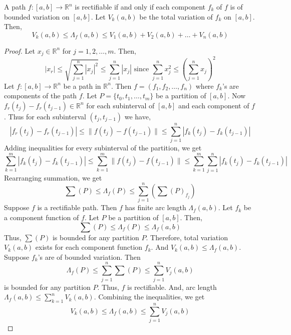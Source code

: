 \begin{theorem}
	A path $f : [a,b] \to \mathbb{R}^n$ is rectifiable if and only if each component $f_k$ of $f$ is of bounded variation on $[a,b]$.
	Let $V_k(a,b)$ be the total variation of $f_k$ on $[a,b]$.
	Then,
	\[ V_k(a,b) \le \Lambda_f(a,b) \le V_1(a,b) + V_2(a,b) + \dots + V_n(a,b) \]
\end{theorem}
\begin{proof}
	Let $x_j \in \mathbb{R}^n$ for $j = 1,2,\dots,m$.
	Then,
	\[ |x_r| \le \sqrt{\sum_{j=1}^n |x_j|^2} \le \sum_{j=1}^n |x_j| \text{ since } \sum_{j=1}^n x_j^2 \le \left(\sum_{j=1}^n x_j\right)^2 \]
	Let $f : [a,b] \to \mathbb{R}^n$ be a path in $\mathbb{R}^n$.
	Then $f = (f_1,f_2,\dots,f_n)$ where $f_k$'s are components of the path $f$.
	Let $P = \{ t_0,t_1,\dots,t_m \}$ be a partition of $[a,b]$.
	Now $f_r(t_j)-f_r(t_{j-1}) \in \mathbb{R}^n$ for each subinterval of $[a,b]$ and each component of $f$.
	Thus for each subinterval $(t_j,t_{j-1})$ we have,
	\[ |f_r(t_j)-f_r(t_{j-1})| \le \| f(t_j)-f(t_{j-1}) \| \le \sum_{j=1}^n |f_k(t_j)-f_k(t_{j-1})| \] 
	Adding inequalities for every subinterval of the partition, we get
	\[ \sum_{k=1}^m |f_k(t_j)-f_k(t_{j-1})| \le \sum_{k=1}^m \| f(t_j)-f(t_{j-1}) \| \le \sum_{k=1}^m \sum_{j=1}^n |f_k(t_j)-f_k(t_{j-1})| \] 
	Rearranging summation, we get
	\[ \sum (P) \le \Lambda_f (P) \le \sum_{j=1}^n \left( \sum (P)_{f_j} \right) \] 
	Suppose $f$ is a rectifiable path.
	Then $f$ has finite arc length $\Lambda_f (a,b)$.
	Let $f_k$ be a component function of $f$.
	Let $P$ be a partition of $[a,b]$.
	Then,
	\[ \sum (P) \le \Lambda_f(P) \le \Lambda_f (a,b) \]
	Thus, $\sum (P)$ is bounded for any partition $P$.
	Therefore, total variation $V_k(a,b)$ exists for each component function $f_k$.
	And $V_k(a,b) \le \Lambda_f(a,b)$.\\

	Suppose $f_k$'s are of bounded variation.
	Then \[ \Lambda_f(P) \le \sum_{j=1}^n \sum (P) \le \sum_{j=1}^n V_j(a,b) \] is bounded for any partition $P$.
	Thus, $f$ is rectifiable.
	And, arc length $\displaystyle \Lambda_f(a,b) \le \sum_{k=1}^n V_k (a,b)$.
	Combining the inequalities, we get
	\[ V_k(a,b) \le \Lambda_f(a,b) \le \sum_{j=1}^n V_j (a,b) \]
\end{proof}
